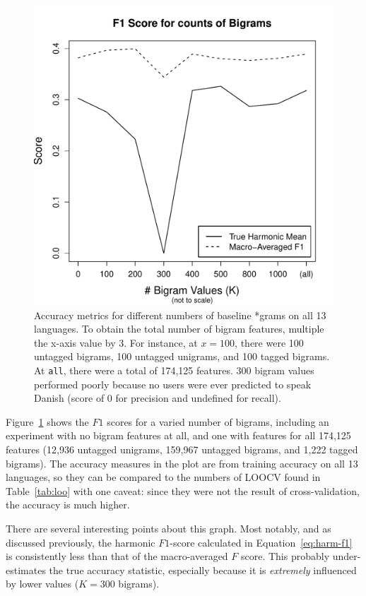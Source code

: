 \documentclass[11pt]{article}
\begin{document}
\begin{figure}[tb]
\centerline{\includegraphics[width=\linewidth]{figs/f1_bigrams}}
\caption{Accuracy metrics for different numbers of baseline *grams on all 13 languages.  To obtain the total number of bigram features, multiple the x-axis value by 3. For instance, at $x=100$, there were 100 untagged bigrams, 100 untagged unigrams, and 100 tagged bigrams.  At {\tt all}, there were a total of 174,125 features.  300 bigram values performed poorly because no users were ever predicted to speak Danish (score of 0 for precision and undefined for recall).}
\label{fig:bigrams}
\end{figure}

Figure~\ref{fig:bigrams} shows the $F1$ scores for a varied number of bigrams, including an experiment with no bigram features at all, and one with features for all 174,125 features (12,936 untagged unigrams, 159,967 untagged bigrams, and 1,222 tagged bigrams).  The accuracy measures in the plot are from training accuracy on all 13 languages, so they can be compared to the numbers of LOOCV found in Table~\ref{tab:loo} with one caveat:  since they were not the result of cross-validation, the accuracy is much higher.  

There are several interesting points about this graph.  Most notably, and as discussed previously, the harmonic $F1$-score calculated in Equation~\ref{eq:harm-f1} is consistently less than that of the macro-averaged $F$ score.  This probably under-estimates the true accuracy statistic, especially because it is {\it extremely} influenced by lower values ($K=300$ bigrams).  
\end{document}

